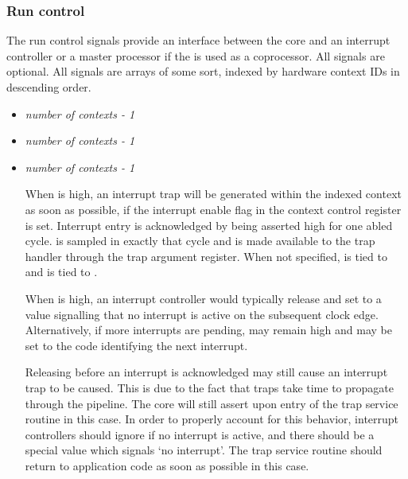 
\subsubsection{Run control}
\label{sec:core-ug-cfg-inst-port-rctrl}

The run control signals provide an interface between the core and an interrupt 
controller or a master processor if the \rvex{} is used as a coprocessor. All 
signals are optional. All signals are arrays of some sort, indexed by hardware 
context IDs in descending order.

\begin{itemize}

\item {}\textit{number of contexts - 1}
\item {}\textit{number of contexts - 1}
\item {}\textit{number of contexts - 1}

When  is high, an interrupt trap will be generated within the 
indexed context as soon as possible, if the interrupt enable flag in the context 
control register is set. Interrupt entry is acknowledged by 
 being asserted high for one abled cycle. 
 is sampled in exactly that cycle and is made available to 
the trap handler through the trap argument register. When not specified, 
 is tied to  and  is tied to 
.

When  is high, an interrupt controller would typically 
release  and set  to a value signalling 
that no interrupt is active on the subsequent clock edge. Alternatively, if more
interrupts are pending,   may remain high and
 may be set to the  code identifying the next interrupt.

Releasing  before an interrupt is acknowledged may still 
cause an interrupt trap to be caused. This is due to the fact that traps take 
time to propagate through the pipeline. The core will still assert 
 upon entry of the trap service routine in this case. In 
order to properly account for this behavior, interrupt controllers should ignore 
 if no interrupt is active, and there should be a special 
 value which signals `no interrupt'. The trap service 
routine should return to application code as soon as possible in this case.


\end{itemize}

